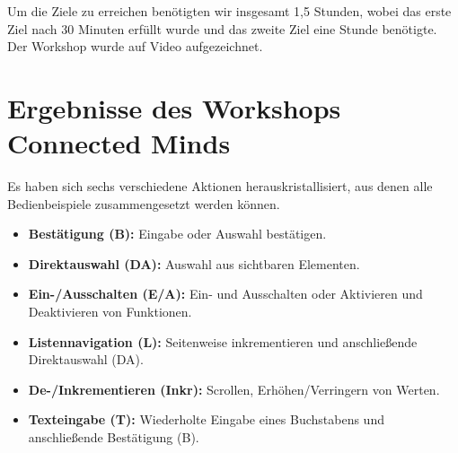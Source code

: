 Um die Ziele zu erreichen benötigten wir insgesamt 1,5 Stunden, wobei das erste Ziel nach 30 Minuten erfüllt wurde und das zweite Ziel eine Stunde benötigte. 
Der Workshop wurde auf Video aufgezeichnet.
\section[Ergebnisse des Workshops]{Ergebnisse des Workshops Connected Minds}
Es haben sich sechs verschiedene Aktionen herauskristallisiert, aus denen alle Bedienbeispiele zusammengesetzt werden können.
\begin{itemize}
	\item \textbf{Bestätigung (B):} Eingabe oder Auswahl bestätigen.
	\item \textbf{Direktauswahl (DA):} Auswahl aus sichtbaren Elementen.
	\item \textbf{Ein-/Ausschalten (E/A):} Ein- und Ausschalten oder Aktivieren und Deaktivieren von Funktionen.
	\item \textbf{Listennavigation (L):} Seitenweise inkrementieren und anschließende Direktauswahl (DA).
	\item \textbf{De-/Inkrementieren (Inkr):}  Scrollen, Erhöhen/Verringern von Werten.
	\item \textbf{Texteingabe (T):}  Wiederholte Eingabe eines Buchstabens und anschließende Bestätigung (B).
\end{itemize}

